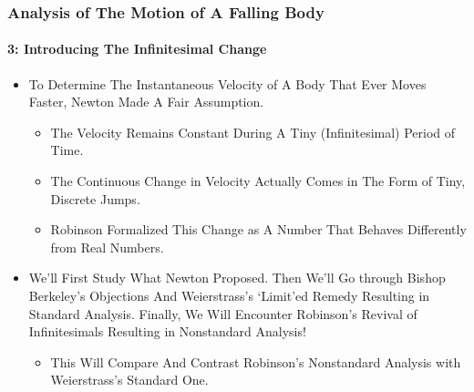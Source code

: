 \begin{frame}
\frametitle{Analysis of The Motion of \alert{A Falling Body}}
\framesubtitle{3: Introducing \alert{The Infinitesimal Change}}
\label{slide:analysis-of-falling-body-3}
\begin{itemize}
\pause
\item To Determine The Instantaneous Velocity of A Body That Ever Moves Faster, Newton Made \alert{A Fair Assumption}.
\begin{itemize}
\pause
\item The Velocity Remains Constant During A Tiny (Infinitesimal) Period of Time.
\pause
\item The Continuous Change in Velocity Actually Comes in The Form of Tiny, Discrete Jumps.
\pause
\item Robinson Formalized This Change as \alert{A Number That Behaves Differently from Real Numbers}.
\end{itemize}
\pause
\item We'll First \alert{Study What Newton Proposed}. Then We'll \alert{Go through Bishop Berkeley's Objections And Weierstrass's `Limit'ed Remedy Resulting in Standard Analysis}. Finally, We Will Encounter \alert{Robinson's Revival of Infinitesimals Resulting in Nonstandard Analysis}!
\begin{itemize}
\pause
\item This Will \alert{Compare And Contrast Robinson's Nonstandard Analysis} with \alert{Weierstrass's Standard One}.
\end{itemize}
\end{itemize}
\end{frame}
